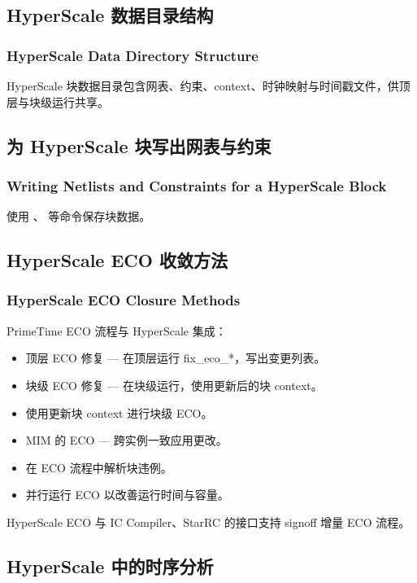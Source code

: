 \subsection{HyperScale 数据目录结构}
\subsubsection*{HyperScale Data Directory Structure}

HyperScale 块数据目录包含网表、约束、context、时钟映射与时间戳文件，供顶层与块级运行共享。

\subsection{为 HyperScale 块写出网表与约束}
\subsubsection*{Writing Netlists and Constraints for a HyperScale Block}

使用 、 等命令保存块数据。

\subsection{HyperScale ECO 收敛方法}
\subsubsection*{HyperScale ECO Closure Methods}

PrimeTime ECO 流程与 HyperScale 集成：
\begin{itemize}
  \item 顶层 ECO 修复 — 在顶层运行 fix_eco_*，写出变更列表。
  \item 块级 ECO 修复 — 在块级运行，使用更新后的块 context。
  \item 使用更新块 context 进行块级 ECO。
  \item MIM 的 ECO — 跨实例一致应用更改。
  \item 在 ECO 流程中解析块违例。
  \item 并行运行 ECO 以改善运行时间与容量。
\end{itemize}

HyperScale ECO 与 IC Compiler、StarRC 的接口支持 signoff 增量 ECO 流程。

\subsection{HyperScale 中的时序分析}
